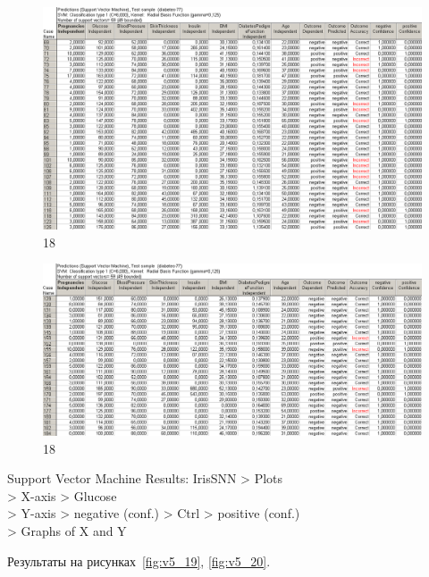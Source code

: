 \begin{figure}[!hp]
  \centering

  \includegraphics[width=14cm]
  {inc/v5_18.PNG}

  \caption{18}

  \label{fig:v5_18}
\end{figure}

\begin{figure}[!hp]
  \centering

  \includegraphics[width=14cm]
  {inc/v5_18_2.PNG}

  \caption{18}

  \label{fig:v5_18_2}
\end{figure}

\newpage

Support Vector Machine Results: IrisSNN > Plots \\
> X-axis > Glucose \\
> Y-axis > negative (conf.) > Ctrl > positive (conf.) \\
> Graphs of X and Y

Результаты на рисунках~\ref{fig:v5_19}, \ref{fig:v5_20}.

